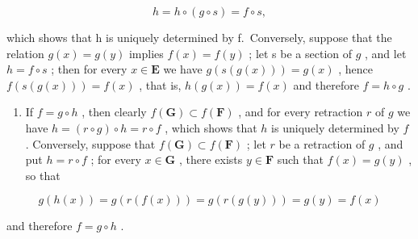 \[
h = h \circ (g \circ s) = f \circ s,
\]

which shows that h is uniquely determined by f.~Conversely, suppose that the relation \(g(x) = g(y)\) implies \(f(x) = f(y)\) ; let s be a section of \(g\) , and let \(h = f \circ s\) ; then for every \(x \in \mathbf{E}\) we have \(g(s(g(x))) = g(x)\) , hence \(f(s(g(x))) = f(x)\) , that is, \(h(g(x)) = f(x)\) and therefore \(f = h \circ g\) .

\begin{enumerate}
\def\labelenumi{(\alph{enumi})}
\setcounter{enumi}{1}
\tightlist
\item
  If \(f = g \circ h\) , then clearly \(f(\mathbf{G}) \subset f(\mathbf{F})\) , and for every retraction \(r\) of \(g\) we have \(h = (r \circ g) \circ h = r \circ f\) , which shows that \(h\) is uniquely determined by \(f\) . Conversely, suppose that \(f(\mathbf{G}) \subset f(\mathbf{F})\) ; let \(r\) be a retraction of \(g\) , and put \(h = r \circ f\) ; for every \(x \in \mathbf{G}\) , there exists \(y \in \mathbf{F}\) such that \(f(x) = g(y)\) , so that
\end{enumerate}

\[
g (h (x)) = g (r (f (x))) = g (r (g (y))) = g (y) = f (x)
\]

and therefore \(f = g \circ h\) .

